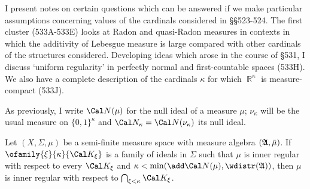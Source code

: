 
\def\chaptername{Topologies and measures III}
\def\sectionname{Special topics}

\def\ureg{\mathop{\text{ureg}}}


I present notes on certain questions which can be answered if we make
particular assumptions concerning values of the cardinals considered in
\S\S523-524.   The first cluster (533A-533E) %
looks at Radon and quasi-Radon measures in contexts in which the additivity
of Lebesgue measure is large compared with other cardinals of the
structures considered.   Developing ideas which arose in the course of
\S531, I discuss `uniform regularity' in perfectly normal and
first-countable spaces (533H).   We also have a complete description of
the cardinals $\kappa$ for which $\BbbR^{\kappa}$ is measure-compact
(533J).

As previously, I write $\Cal N(\mu)$ for the null ideal of a measure
$\mu$;   $\nu_{\kappa}$ will be the usual measure on $\{0,1\}^{\kappa}$
and $\Cal N_{\kappa}=\Cal N(\nu_{\kappa})$ its null ideal.

 Let $(X,\Sigma,\mu)$ be a semi-finite measure space
with measure algebra $(\frak A,\bar\mu)$.   If
$\ofamily{\xi}{\kappa}{\Cal K_{\xi}}$ is a family of ideals in $\Sigma$
such that $\mu$ is inner regular with respect to every
$\Cal K_{\xi}$ and
$\kappa<\min(\add\Cal N(\mu),\wdistr(\frak A))$, then $\mu$ is inner
regular with respect to $\bigcap_{\xi<\kappa}\Cal K_{\xi}$.


